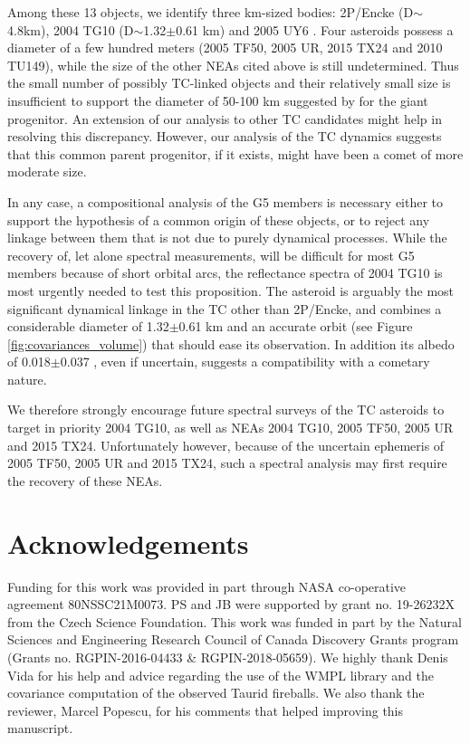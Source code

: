 \documentclass[letters,a4paper,fleqn,usenatbib]{mnras}
\begin{document}
Among these 13 objects, we identify three km-sized bodies: 2P/Encke (D$\sim$4.8km), 2004 TG10 (D$\sim$1.32$\pm$0.61 km) and 2005 UY6 \citep[D$\sim$2.249$\pm$1.084 km, cf.][]{Masiero2017}. Four asteroids possess a diameter of a few hundred meters (2005 TF50, 2005 UR, 2015 TX24 and 2010 TU149), while the size of the other NEAs cited above is still undetermined. Thus the small number of possibly TC-linked objects and their relatively small size is insufficient to support the diameter of 50-100 km suggested by \cite{Clube1984} for the giant progenitor. An extension of our analysis to other TC candidates \citep[and especially those belonging to the \emph{Hephaistos group} of][]{Asher1993} might help in resolving this discrepancy. However, our analysis of the TC dynamics suggests that this common parent progenitor, if it exists, might have been a comet of more moderate size. 

In any case, a compositional analysis of the G5 members is necessary either to support the hypothesis of a common origin of these objects, or to reject any linkage between them that is not due to purely dynamical processes. While the recovery of, let alone spectral measurements, will be difficult for most G5 members because of short orbital arcs, the reflectance spectra of 2004 TG10 is most urgently needed to test this proposition. The asteroid is arguably the most significant dynamical linkage in the TC other than 2P/Encke, and combines a considerable diameter of 1.32$\pm$0.61 km \citep{Nugent2015} and an accurate orbit (see Figure \ref{fig:covariances_volume}) that should ease its observation. In addition its albedo of 0.018$\pm$0.037 \citep{Nugent2015}, even if uncertain, suggests a compatibility with a cometary nature. 

We therefore strongly encourage future spectral surveys of the TC asteroids to target in priority 2004 TG10, as well as NEAs 2004 TG10, 2005 TF50, 2005 UR and 2015 TX24. Unfortunately however, because of the uncertain ephemeris of 2005 TF50, 2005 UR and 2015 TX24, such a spectral analysis may first require the recovery of these NEAs. 

\section*{Acknowledgements}

Funding for this work was provided in part through NASA co-operative agreement 80NSSC21M0073. PS and JB were supported by grant no. 19-26232X from the Czech Science Foundation. This work was funded in part by the Natural Sciences and Engineering Research Council of Canada Discovery Grants program (Grants no. RGPIN-2016-04433 \& RGPIN-2018-05659). We highly thank Denis Vida for his help and advice regarding the use of the WMPL library and the covariance computation of the observed Taurid fireballs. We also thank the reviewer, Marcel Popescu, for his comments that helped improving this manuscript.
\end{document}
